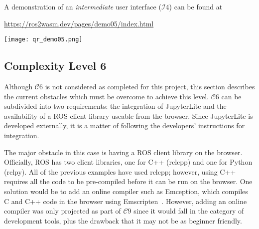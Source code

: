         \vspace{1em}
        \begin{tcolorbox}[title=Example 8]
            \begin{minipage}[t]{0.87\linewidth}
                \vspace*{0.5\baselineskip}
                A demonstration of an \textit{intermediate} user interface ($\mathcal{I}4$) can be found at 
                
                \href{https://ros2wasm.dev/pages/demo05/index.html}{\textsf{https://ros2wasm.dev/pages/demo05/index.html}}
            \end{minipage}\hfill%
            \begin{minipage}[t]{0.1\linewidth}
                \vspace*{0pt}
                \texttt{[image: qr\_demo05.png]}
            \end{minipage}
        \end{tcolorbox}



    
    \subsection{Complexity Level 6}

    Although $\mathcal{C}6$ is not considered as completed for this project, this section describes the current obstacles which must be overcome to achieve this level. $\mathcal{C}6$ can be subdivided into two requirements: the integration of JupyterLite and the availability of a \ac{ROS} client library useable from the browser. Since JupyterLite is developed externally, it is a matter of following the developers' instructions for integration. 

    The major obstacle in this case is having a \ac{ROS} client library on the browser. Officially, \ac{ROS} has two client libraries, one for C++ (\textsf{rclcpp}) and one for Python (\textsf{rclpy}). All of the previous examples have used \textsf{rclcpp}; however, using C++ requires all the code to be pre-compiled before it can be run on the browser. One solution would be to add an online compiler such as Emception, which compiles C and C++ code in the browser using Emscripten~\cite{emception}. However, adding an online compiler was only projected as part of $\mathcal{C}9$ since it would fall in the category of development tools, plus the drawback that it may not be as beginner friendly.

